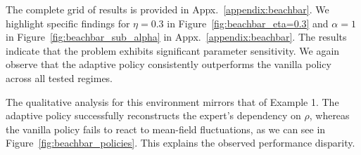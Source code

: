 \documentclass{article}
\theoremstyle{plain}
\begin{document}
The complete grid of results is provided in Appx.~\ref{appendix:beachbar}. We highlight specific findings for  $\eta = 0.3$ in Figure~\ref{fig:beachbar_eta=0.3} and $\alpha = 1$ in Figure~\ref{fig:beachbar_sub_alpha} in Appx.~\ref{appendix:beachbar}. The results indicate that the problem exhibits significant parameter sensitivity. We again observe that the adaptive policy consistently outperforms the vanilla policy across all tested regimes. 

The qualitative analysis for this environment mirrors that of Example 1. The adaptive policy successfully reconstructs the expert’s dependency on $\rho$, whereas the vanilla policy fails to react to mean-field fluctuations, as we can see in Figure~\ref{fig:beachbar_policies}. This explains the observed performance disparity.

\end{document}
